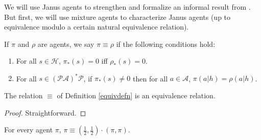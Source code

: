 \documentclass[runningheads]{llncs}
\begin{document}
We will use Janus agents to strengthen and formalize an informal result
from \cite{alexander2021reward}.
But first, we will use mixture agents to characterize
Janus agents (up to equivalence modulo a certain natural equivalence relation).

\begin{definition}
\label{equivdefn}
    If $\pi$ and $\rho$ are agents, we say $\pi\equiv\rho$ if the
    following conditions hold:
    \begin{enumerate}
        \item For all $s\in\mathcal H$, $\pi_*(s)=0$ iff $\rho_*(s)=0$.
        \item For all $s\in(\mathcal P\mathcal A)^*\mathcal P$,
            if $\pi_*(s)\not=0$ then for all $a\in\mathcal A$,
            $\pi(a|h)=\rho(a|h)$.
    \end{enumerate}
\end{definition}

\begin{lemma}
\label{equivrelationlemma}
    The relation $\equiv$ of Definition \ref{equivdefn} is an equivalence
    relation.
\end{lemma}

\begin{proof}
    Straightforward.
\end{proof}

\begin{lemma}
\label{piopluspilemma}
    For every agent $\pi$, $\pi\equiv(\frac12,\frac12)\cdot(\pi,\pi)$.
\end{lemma}
\end{document}
